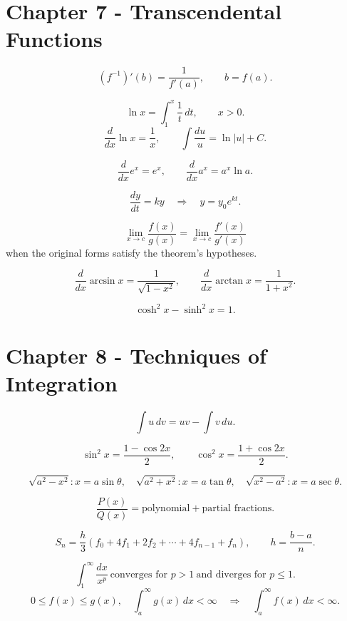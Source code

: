 
\section*{Chapter 7 - Transcendental Functions}

\[
  (f^{-1})'(b)=\frac{1}{f'(a)},
  \qquad b=f(a).
\]

\[
  \ln x=\int_1^x\frac1t\,dt,
  \qquad x>0.
\]
\[
  \frac{d}{dx}\ln x=\frac1x,
  \qquad
  \int\frac{du}{u}=\ln|u|+C.
\]

\[
  \frac{d}{dx}e^x=e^x,
  \qquad
  \frac{d}{dx}a^x=a^x\ln a.
\]

\[
  \frac{dy}{dt}=ky
  \quad\Longrightarrow\quad
  y=y_0e^{kt}.
\]

\[
  \lim_{x\to c}\frac{f(x)}{g(x)}
  =
  \lim_{x\to c}\frac{f'(x)}{g'(x)}
\]
when the original forms satisfy the theorem's hypotheses.

\[
  \frac{d}{dx}\arcsin x=\frac1{\sqrt{1-x^2}},
  \qquad
  \frac{d}{dx}\arctan x=\frac1{1+x^2}.
\]

\[
  \cosh^2x-\sinh^2x=1.
\]

\section*{Chapter 8 - Techniques of Integration}

\[
  \int u\,dv=uv-\int v\,du.
\]

\[
  \sin^2x=\frac{1-\cos2x}{2},
  \qquad
  \cos^2x=\frac{1+\cos2x}{2}.
\]

\[
  \sqrt{a^2-x^2}:x=a\sin\theta,
  \quad
  \sqrt{a^2+x^2}:x=a\tan\theta,
  \quad
  \sqrt{x^2-a^2}:x=a\sec\theta.
\]

\[
  \frac{P(x)}{Q(x)}
  =
  \text{polynomial}+\text{partial fractions}.
\]

\[
  S_n=\frac h3\left(
  f_0+4f_1+2f_2+\cdots+4f_{n-1}+f_n
  \right),
  \qquad h=\frac{b-a}{n}.
\]

\[
  \int_1^\infty\frac{dx}{x^p}
  \ \text{converges for }p>1
  \ \text{and diverges for }p\le1.
\]
\[
  0\le f(x)\le g(x),
  \quad
  \int_a^\infty g(x)\,dx<\infty
  \quad\Longrightarrow\quad
  \int_a^\infty f(x)\,dx<\infty.
\]

